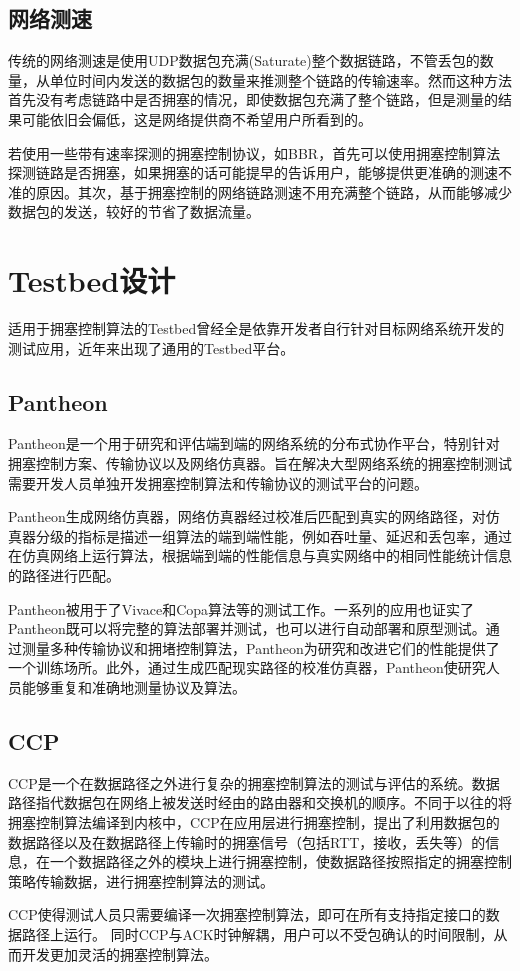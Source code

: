 \documentclass[a4paper, 12pt, UTF8]{ctexart}
\begin{document}
\subsection{网络测速}
\par 传统的网络测速是使用UDP数据包充满(Saturate)整个数据链路，不管丢包的数量，从单位时间内发送的数据包的数量来推测整个链路的传输速率。然而这种方法首先没有考虑链路中是否拥塞的情况，即使数据包充满了整个链路，但是测量的结果可能依旧会偏低，这是网络提供商不希望用户所看到的。
\par 若使用一些带有速率探测的拥塞控制协议，如BBR，首先可以使用拥塞控制算法探测链路是否拥塞，如果拥塞的话可能提早的告诉用户，能够提供更准确的测速不准的原因\cite{DBLP:conf/imc/SundaresanDFLD17}。其次，基于拥塞控制的网络链路测速不用充满整个链路，从而能够减少数据包的发送，较好的节省了数据流量。


\clearpage 

\section{Testbed设计}
\par 适用于拥塞控制算法的Testbed曾经全是依靠开发者自行针对目标网络系统开发的测试应用，近年来出现了通用的Testbed平台。
\subsection{Pantheon}
\par Pantheon是一个用于研究和评估端到端的网络系统的分布式协作平台，特别针对拥塞控制方案、传输协议以及网络仿真器。旨在解决大型网络系统的拥塞控制测试需要开发人员单独开发拥塞控制算法和传输协议的测试平台的问题。
\par Pantheon生成网络仿真器，网络仿真器经过校准后匹配到真实的网络路径，对仿真器分级的指标是描述一组算法的端到端性能，例如吞吐量、延迟和丢包率，通过在仿真网络上运行算法，根据端到端的性能信息与真实网络中的相同性能统计信息的路径进行匹配。
\par Pantheon被用于了Vivace和Copa算法等的测试工作。一系列的应用也证实了Pantheon既可以将完整的算法部署并测试，也可以进行自动部署和原型测试。通过测量多种传输协议和拥堵控制算法，Pantheon为研究和改进它们的性能提供了一个训练场所。此外，通过生成匹配现实路径的校准仿真器，Pantheon使研究人员能够重复和准确地测量协议及算法\cite{DBLP:conf/usenix/YanMHRWLW18}。

\subsection{CCP}
\par CCP是一个在数据路径之外进行复杂的拥塞控制算法的测试与评估的系统。数据路径指代数据包在网络上被发送时经由的路由器和交换机的顺序。不同于以往的将拥塞控制算法编译到内核中，CCP在应用层进行拥塞控制，提出了利用数据包的数据路径以及在数据路径上传输时的拥塞信号（包括RTT，接收，丢失等）的信息，在一个数据路径之外的模块上进行拥塞控制，使数据路径按照指定的拥塞控制策略传输数据，进行拥塞控制算法的测试。
\par CCP使得测试人员只需要编译一次拥塞控制算法，即可在所有支持指定接口的数据路径上运行。
同时CCP与ACK时钟解耦，用户可以不受包确认的时间限制，从而开发更加灵活的拥塞控制算法\cite{DBLP:conf/sigcomm/NarayanCRGNMAB18}。
\clearpage
\end{document}
